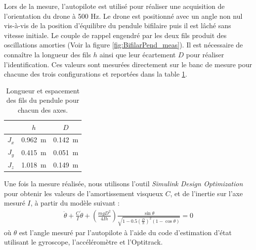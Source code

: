     Lors de la mesure, l'autopilote est utilisé pour réaliser une acquisition de l'orientation du drone à 500 Hz. Le drone est positionné avec un angle non nul vis-à-vis de la position d'équilibre du pendule bifilaire puis il est lâché sans vitesse initiale. Le couple de rappel engendré par les deux fils produit des oscillations amorties (Voir la figure \ref{fig:BifilarPend_meas}). Il est nécessaire de connaître la longueur des fils $h$ ainsi que leur écartement $D$ pour réaliser l'identification. Ces valeurs sont mesurées directement sur le banc de mesure pour chacune des trois configurations et reportées dans la table \ref{tab:lgFils}.

    \begin{table}[ht]
        \centering
        \begin{tabular}{|c|c|c|}
            \hline
             & $h$ & $D$  \\
            \hline\hline
            $J_{x}$ & \SI{0.962}{\meter}  & \SI{0.142}{\meter}  \\
            \hline 
            $J_{y}$ & \SI{0.415}{\meter}  & \SI{0.051}{\meter}  \\
            \hline
            $J_{z}$ & \SI{1.018}{\meter}  & \SI{0.149}{\meter} \\
            \hline
        \end{tabular}
        \caption{Longueur et espacement des fils du pendule pour chacun des axes.} 
        \label{tab:lgFils}
    \end{table}

    Une fois la mesure réalisée, nous utilisons l'outil \textit{Simulink Design Optimization} pour obtenir les valeurs de l'amortissement visqueux $C$, et de l'inertie sur l'axe mesuré $I$, à partir du modèle suivant :
    \begin{align*}
        \ddot{\theta} +  \frac{C}{I}\dot{\theta} + \left(\frac{mgD^2}{4Ih}\right)\frac{\sin\theta}{\sqrt{1 - 0.5\left(\frac{D}{h}\right)^2(1 - \cos\theta)}} = 0
    \end{align*}
    où $\theta$ est l'angle mesuré par l'autopilote à l'aide du code d'estimation d'état utilisant le gyroscope, l'accéléromètre et l'Optitrack.
    

